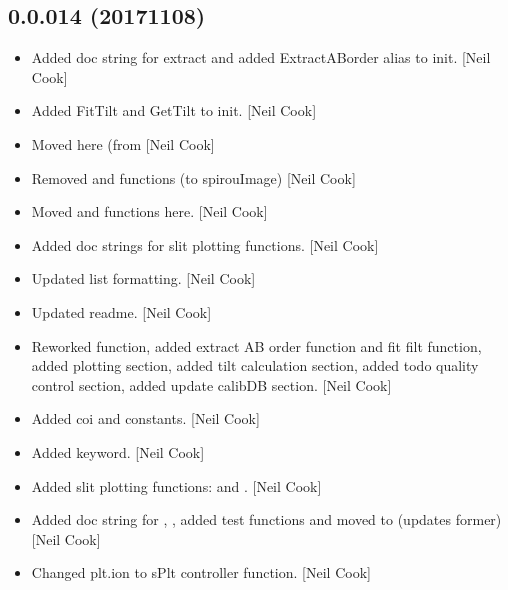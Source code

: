 \documentclass[a4paper,10pt,english]{report}
\begin{document}
\subsection{0.0.014 (2017\sphinxhyphen{}11\sphinxhyphen{}08)}
\label{\detokenize{misc/changelog:id555}}\begin{itemize}
\item {} 
Added doc string for extract and added ExtractABorder alias to init.
{[}Neil Cook{]}

\item {} 
Added FitTilt and GetTilt to init. {[}Neil Cook{]}

\item {} 
Moved  here (from  {[}Neil Cook{]}

\item {} 
Removed  and  functions (to spirouImage) {[}Neil Cook{]}

\item {} 
Moved  and  functions here. {[}Neil Cook{]}

\item {} 
Added doc strings for slit plotting functions. {[}Neil Cook{]}

\item {} 
Updated  list formatting. {[}Neil Cook{]}

\item {} 
Updated readme. {[}Neil Cook{]}

\item {} 
Reworked  function, added extract AB order function and fit
filt function, added plotting section, added tilt calculation section,
added todo quality control section, added update calibDB section.
{[}Neil Cook{]}

\item {} 
Added coi  and  constants. {[}Neil Cook{]}

\item {} 
Added  keyword. {[}Neil Cook{]}

\item {} 
Added slit plotting functions:  and
. {[}Neil Cook{]}

\item {} 
Added doc string for , , added test
functions  and moved  to
 (updates former) {[}Neil Cook{]}

\item {} 
Changed plt.ion to sPlt controller function. {[}Neil Cook{]}

\end{itemize}
\end{document}
